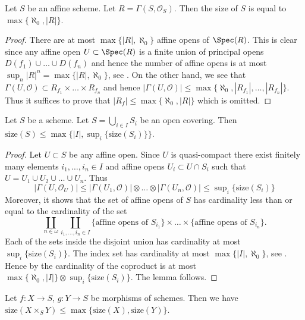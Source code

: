 \begin{lemma}
\label{lemma-bound-affine}
Let $S$ be an affine scheme.
Let $R = \Gamma(S, \mathcal{O}_S)$.
Then the size of $S$ is equal to $\max\{ \aleph_0, |R|\}$.
\end{lemma}

\begin{proof}
There are at most $\max\{|R|, \aleph_0\}$ affine opens of
$\Spec(R)$. This is clear since any affine open
$U \subset \Spec(R)$ is a finite union of principal
opens $D(f_1) \cup \ldots \cup D(f_n)$ and hence the number
of affine opens is at most $\sup_n |R|^n = \max\{|R|, \aleph_0\}$,
see \cite[Ch. I, 10.13]{Kunen}. On the other hand, we see that
$\Gamma(U, \mathcal{O}) \subset R_{f_1} \times \ldots \times R_{f_n}$
and hence $|\Gamma(U, \mathcal{O})| \leq
\max\{\aleph_0, |R_{f_1}|, \ldots, |R_{f_n}|\}$. Thus
it suffices to prove that $|R_f| \leq \max\{\aleph_0, |R|\}$
which is omitted.
\end{proof}

\begin{lemma}
\label{lemma-bound-size}
Let $S$ be a scheme. Let $S = \bigcup_{i \in I} S_i$ be
an open covering. Then
$\text{size}(S) \leq \max\{|I|, \sup_i\{\text{size}(S_i)\}\}$.
\end{lemma}

\begin{proof}
Let $U \subset S$ be any affine open. Since $U$ is quasi-compact
there exist finitely many elements $i_1, \ldots, i_n \in I$
and affine opens $U_i \subset U \cap S_i$ such that
$U = U_1 \cup U_2 \cup \ldots \cup U_n$. Thus
$$
|\Gamma(U, \mathcal{O}_U)|
\leq
|\Gamma(U_1, \mathcal{O})|
\otimes
\ldots
\otimes
|\Gamma(U_n, \mathcal{O})|
\leq \sup\nolimits_i\{\text{size}(S_i)\}
$$
Moreover, it shows that the set of affine opens of $S$ has
cardinality less than or equal to the cardinality of the set
$$
\coprod_{n \in \omega}
\coprod_{i_1, \ldots, i_n \in I}
\{\text{affine opens of }S_{i_1}\}
\times
\ldots
\times
\{\text{affine opens of }S_{i_n}\}.
$$
Each of the sets inside the disjoint union has cardinality at most
$\sup_i\{\text{size}(S_i)\}$. The index set has cardinality at most
$\max\{|I|, \aleph_0\}$, see \cite[Ch. I, 10.13]{Kunen}.
Hence by \cite[Lemma 5.8]{Jech} the cardinality
of the coproduct is at most $\max\{\aleph_0, |I|\}
\otimes \sup_i\{\text{size}(S_i)\}$. The lemma follows.
\end{proof}

\begin{lemma}
\label{lemma-bound-size-fibre-product}
Let $f : X \to S$, $g : Y \to S$ be morphisms of schemes.
Then we have
$\text{size}(X \times_S Y) \leq \max\{\text{size}(X), \text{size}(Y)\}$.
\end{lemma}

